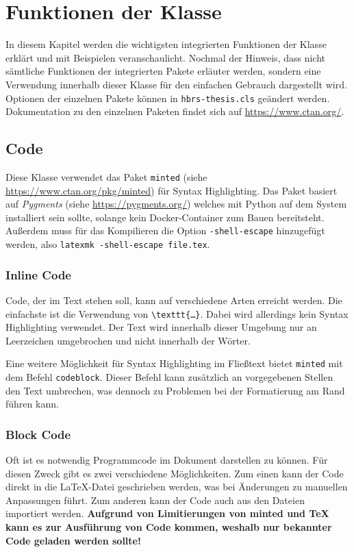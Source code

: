 \chapter{Funktionen der Klasse}
In diesem Kapitel werden die wichtigsten integrierten Funktionen der Klasse erklärt und mit Beispielen veranschaulicht. Nochmal der Hinweis, dass nicht sämtliche Funktionen der integrierten Pakete erläuter werden, sondern eine Verwendung innerhalb dieser Klasse für den einfachen Gebrauch dargestellt wird. Optionen der einzelnen Pakete können in \texttt{hbrs-thesis.cls} geändert werden. Dokumentation zu den einzelnen Paketen findet sich auf \url{https://www.ctan.org/}.

\section{Code}
Diese Klasse verwendet das Paket \texttt{minted} (siehe \url{https://www.ctan.org/pkg/minted}) für Syntax Highlighting. Das Paket basiert auf \textit{Pygments} (siehe \url{https://pygments.org/}) welches mit Python auf dem System installiert sein sollte, solange kein Docker-Container zum Bauen bereitsteht. Außerdem muss für das Kompilieren die Option \texttt{-shell-escape} hinzugefügt werden, also \texttt{latexmk -shell-escape file.tex}.

\subsection{Inline Code}
Code, der im Text stehen soll, kann auf verschiedene Arten erreicht werden. Die einfachste ist die Verwendung von \texttt{\textbackslash{}texttt\{…\}}. Dabei wird allerdings kein Syntax Highlighting verwendet. Der Text wird innerhalb dieser Umgebung nur an Leerzeichen umgebrochen und nicht innerhalb der Wörter.

Eine weitere Möglichkeit für Syntax Highlighting im Fließtext bietet \texttt{minted} mit dem Befehl \texttt{\texttt{codeblock}}. Dieser Befehl kann zusätzlich an vorgegebenen Stellen den Text umbrechen, was dennoch zu Problemen bei der Formatierung am Rand führen kann.

\subsection{Block Code}
Oft ist es notwendig Programmcode im Dokument darstellen zu können. Für diesen Zweck gibt es zwei verschiedene Möglichkeiten. Zum einen kann der Code direkt in die \LaTeX-Datei geschrieben werden, was bei Änderungen zu manuellen Anpassungen führt. Zum anderen kann der Code auch aus den Dateien importiert werden. \textbf{Aufgrund von Limitierungen von minted und TeX kann es zur Ausführung von Code kommen, weshalb nur bekannter Code geladen werden sollte!}

